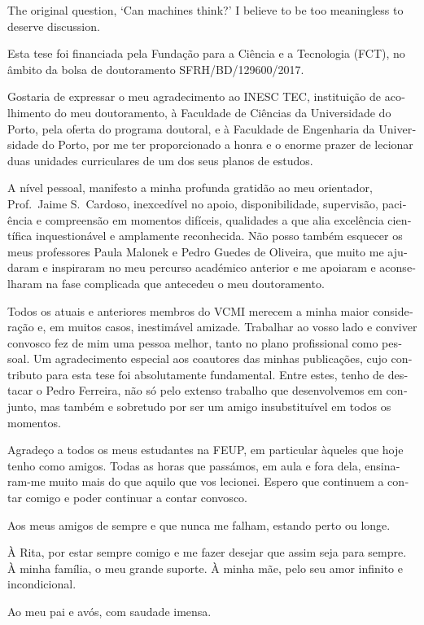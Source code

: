 
{
	The original question, ‘Can machines think?’ I believe to be too meaningless to deserve discussion.
}

\begin{acknowledgements}
\begin{otherlanguage}{portuguese}
Esta tese foi financiada pela Fundação para a Ciência e a Tecnologia (FCT), no âmbito da bolsa de doutoramento SFRH/BD/129600/2017.

Gostaria de expressar o meu agradecimento ao INESC TEC, instituição de acolhimento do meu doutoramento, à Faculdade de Ciências da Universidade do Porto, pela oferta do programa doutoral, e à Faculdade de Engenharia da Universidade do Porto, por me ter proporcionado a honra e o enorme prazer de lecionar duas unidades curriculares de um dos seus planos de estudos.

A nível pessoal, manifesto a minha profunda gratidão ao meu orientador, Prof.\ Jaime S.\ Cardoso, inexcedível no apoio, disponibilidade, supervisão, paciência e compreensão em momentos difíceis, qualidades a que alia excelência científica inquestionável e amplamente reconhecida. Não posso também esquecer os meus professores Paula Malonek e Pedro Guedes de Oliveira, que muito me ajudaram e inspiraram no meu percurso académico anterior e me apoiaram e aconselharam na fase complicada que antecedeu o meu doutoramento.

Todos os atuais e anteriores membros do VCMI merecem a minha maior consideração e, em muitos casos, inestimável amizade. Trabalhar ao vosso lado e conviver convosco fez de mim uma pessoa melhor, tanto no plano profissional como pessoal. Um agradecimento especial aos coautores das minhas publicações, cujo contributo para esta tese foi absolutamente fundamental. Entre estes, tenho de destacar o Pedro Ferreira, não só pelo extenso trabalho que desenvolvemos em conjunto, mas também e sobretudo por ser um amigo insubstituível em todos os momentos.

Agradeço a todos os meus estudantes na FEUP, em particular àqueles que hoje tenho como amigos. Todas as horas que passámos, em aula e fora dela, ensinaram-me muito mais do que aquilo que vos lecionei. Espero que continuem a contar comigo e poder continuar a contar convosco.

Aos meus amigos de sempre e que nunca me falham, estando perto ou longe.

À Rita, por estar sempre comigo e me fazer desejar que assim seja para sempre. À minha família, o meu grande suporte. À minha mãe, pelo seu amor infinito e incondicional.

\vspace{11pt}

Ao meu pai e avós, com saudade imensa.

\end{otherlanguage}
\end{acknowledgements}

